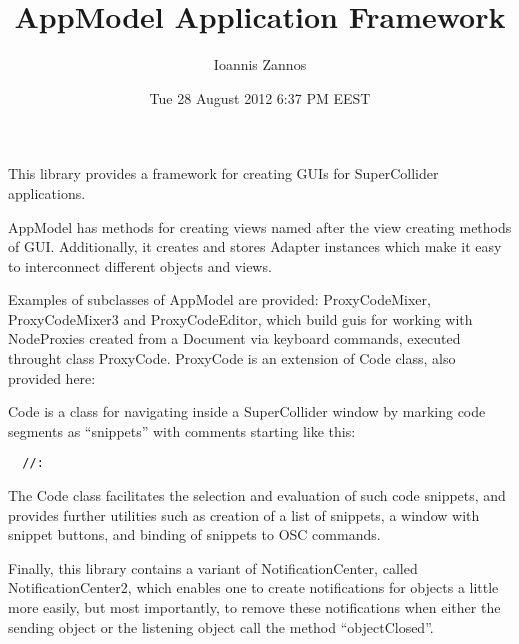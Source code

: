 \documentclass[11pt, a4paper]{scrartcl}
\begin{document}
\title{AppModel Application Framework}
\author{Ioannis Zannos}
\date{Tue 28 August 2012  6:37 PM EEST}
\maketitle


This library provides a framework for creating GUIs for SuperCollider applications. 

AppModel has methods for creating views named after the view creating methods of GUI. Additionally, it creates and stores Adapter instances which make it easy to interconnect different objects and views. 

Examples of subclasses of AppModel are provided: ProxyCodeMixer, ProxyCodeMixer3 and ProxyCodeEditor, which build guis for working with NodeProxies created from a Document via keyboard commands, executed throught class ProxyCode.  ProxyCode is an extension of Code class, also provided here: 

Code is a class for navigating inside a SuperCollider window by marking code segments as ``snippets'' with comments starting like this: 

\begin{verbatim}
  //: 
\end{verbatim}


The Code class facilitates the selection and evaluation of such code snippets, and provides further utilities such as creation of a list of snippets, a window with snippet buttons, and binding of snippets to OSC commands. 

Finally, this library contains a variant of NotificationCenter, called NotificationCenter2, which enables one to create notifications for objects a little more easily, but most importantly, to remove these notifications when either the sending object or the listening object call the method ``objectClosed''. 
\end{document}
